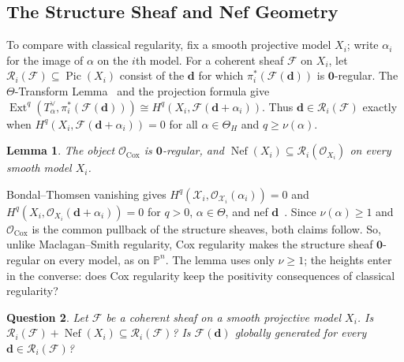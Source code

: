 \documentclass[11pt,reqno]{amsart}
\newtheorem{lemma}{Lemma}[section]
\newtheorem{question}[lemma]{Question}
\theoremstyle{remark}
\newcommand{\Ext}{\operatorname{Ext}}
\newcommand{\Pic}{\operatorname{Pic}}
\newcommand{\Nef}{\operatorname{Nef}}
\newcommand{\Cox}{\operatorname{Cox}}
\newcommand{\dd}{\mathbf{d}}
\newcommand{\zero}{\mathbf{0}}
\newcommand{\PP}{\mathbb{P}}
\newcommand{\cF}{\mathcal{F}}
\newcommand{\cH}{\mathcal{H}}
\newcommand{\cO}{\mathcal{O}}
\newcommand{\cR}{\mathcal{R}}
\newcommand{\cX}{\mathcal{X}}
\begin{document}
\subsection{The Structure Sheaf and Nef Geometry}\label{subsec:cox-regularity}

To compare with classical regularity, fix a smooth projective model $X_i$; write $\alpha_i$ for the image of $\alpha$ on the $i$th model. For a coherent sheaf $\cF$ on $X_i$, let $\cR_i(\cF)\subseteq\Pic(X_i)$ consist of the $\dd$ for which $\pi_i^*(\cF(\dd))$ is $\zero$-regular. The $\Theta$-Transform Lemma~\cite[Lemma~1.6]{longLiveKing} and the projection formula give $\Ext^q(T_\alpha^\vee,\pi_i^*(\cF(\dd)))\cong H^q(X_i,\cF(\dd+\alpha_i))$. Thus $\dd\in\cR_i(\cF)$ exactly when $H^q(X_i,\cF(\dd+\alpha_i))=0$ for all $\alpha\in\Theta_H$ and $q\ge\nu(\alpha)$.


\begin{lemma}\label{lem:cox-structure-regular}
The object $\cO_{\Cox}$ is $\zero$-regular, and $\Nef(X_i)\subseteq\cR_i(\cO_{X_i})$ on every smooth model $X_i$.
\end{lemma}

Bondal--Thomsen vanishing gives $H^q(\cX_i,\cO_{\cX_i}(\alpha_i))=0$ and $H^q(X_i,\cO_{X_i}(\dd+\alpha_i))=0$ for $q>0$, $\alpha\in\Theta$, and nef $\dd$~\cite[Thm.~2.11]{longLiveKing}. Since $\nu(\alpha)\ge1$ and $\cO_{\Cox}$ is the common pullback of the structure sheaves, both claims follow. So, unlike Maclagan--Smith regularity, Cox regularity makes the structure sheaf $\zero$-regular on every model, as on $\PP^n$. The lemma uses only $\nu\ge1$; the heights enter in the converse: does Cox regularity keep the positivity consequences of classical regularity?
 

\begin{question}\label{q:cox-regularity-tests}
Let $\cF$ be a coherent sheaf on a smooth projective model $X_i$. Is $\cR_i(\cF)+\Nef(X_i)\subseteq\cR_i(\cF)$? Is $\cF(\dd)$ globally generated for every $\dd\in\cR_i(\cF)$?
\end{question}
\end{document}
